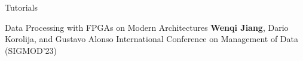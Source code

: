\begin{rSection}{Tutorials}

\begin{enumerate}[label={[\arabic*]}]

\item 
\begin{Pub}{Data Processing with FPGAs on Modern Architectures}
{\textbf{Wenqi Jiang}, Dario Korolija, and Gustavo Alonso}
{International Conference on Management of Data (SIGMOD'23)}
\end{Pub}\end{enumerate}
\end{rSection}

